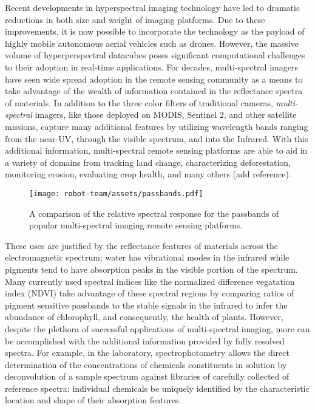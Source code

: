 Recent developments in hyperspectral imaging technology have led to dramatic reductions in both size and weight of imaging platforms. Due to these improvements, it is now possible to incorporate the technology as the payload of highly mobile autonomous aerial vehicles such as drones. However, the massive volume of hyperperspectral datacubes poses significant computational challenges to their adoption in real-time applications. For decades, multi-spectral imagers have seen wide spread adoption in the remote sensing community as a means to take advantage of the wealth of information contained in the reflectance spectra of materials. In addition to the three color filters of traditional cameras, \textit{multi-spectral} imagers, like those deployed on MODIS, Sentinel 2, and other satellite missions, capture many additional features by utilizing wavelength bands ranging from the near-UV, through the visible spectrum, and into the Infrared. With this additional information, multi-spectral remote sensing platforms are able to aid in a variety of domains from tracking land change, characterizing deforestation, monitoring erosion, evaluating crop health, and many others (add reference).

\begin{figure}[!hbt]
  \centering
  \texttt{[image: robot-team/assets/passbands.pdf]}
  \caption{A comparison of the relative spectral response for the passbands of popular multi-spectral imaging remote sensing platforms.}
  \label{fig:passbands}
\end{figure}

These uses are justified by the reflectance features of materials across the electromagnetic spectrum; water has vibrational modes in the infrared while pigments tend to have absorption peaks in the visible portion of the spectrum. Many currently used spectral indices like the normalized difference vegatation index (NDVI) take advantage of these spectral regions by comparing ratios of pigment sensitive passbands to the stable signals in the infrared to infer the abundance of chlorophyll, and consequently, the health of plants.  However, despite the plethora of successful applications of multi-spectral imaging, more can be accomplished with the additional information provided by fully resolved spectra. For example, in the laboratory, spectrophotometry allows the direct determination of the concentrations of chemicals constituents in solution by deconvolution of a sample spectrum against libraries of carefully collected of reference spectra: individual chemicals be uniquely identified by the characteristic location and shape of their absorption features.

